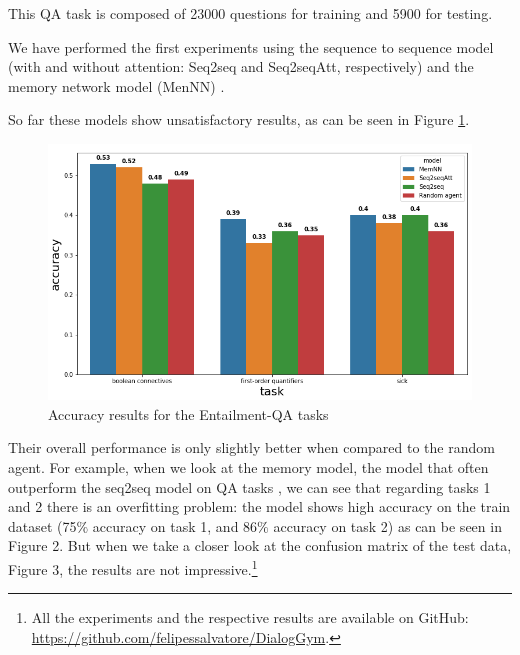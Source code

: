 This QA task is composed of 23000 questions for training and 5900 for testing.

We have performed the first experiments using the sequence to sequence model \cite{Sustskever}(with and without attention: Seq2seq and Seq2seqAtt, respectively) and the memory network model (MenNN) \cite{WestonCB14}.

So far these models show unsatisfactory results, as can be seen in Figure \ref{EntailQAresults}.

\begin{center}
\begin{figure}[h]
\label{EntailQAresults}
\includegraphics[width=13.0cm]{img/comparative_results.png}
\caption{Accuracy results for the Entailment-QA tasks}
\end{figure}
\end{center}

Their overall performance is only slightly better when compared to the random agent. For example, when we look at the memory model, the model that often  outperform the seq2seq model on QA tasks \cite{WestonBCM15}, we can see that regarding tasks 1 and 2 there is an overfitting problem: the model shows high accuracy on the train dataset (75$\%$ accuracy on task 1, and 86$\%$ accuracy on task 2) as can be seen in Figure 2. But when we take a closer look at the confusion matrix of the test data, Figure 3, the results are not impressive.\footnote{All the experiments and the respective results are available on GitHub: \url{https://github.com/felipessalvatore/DialogGym}.}
  

